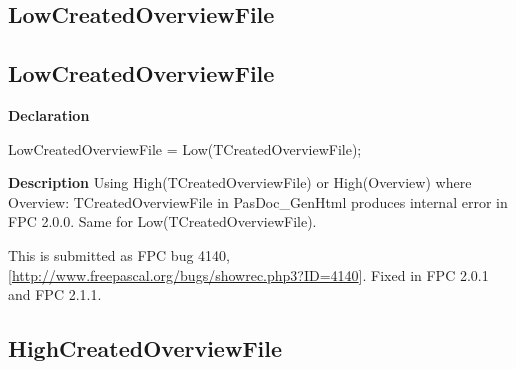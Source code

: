 \documentclass{report}
\newif\ifpdf
\begin{document}
\subsection*{\large{\textbf{LowCreatedOverviewFile}}\normalsize\hspace{1ex}\hrulefill}
\else
\subsection*{LowCreatedOverviewFile}
\fi
\label{PasDoc_Gen-LowCreatedOverviewFile}
\begin{list}{}{
\setlength{\itemindent}{0cm}
\setlength{\listparindent}{0cm}
\setlength{\leftmargin}{\evensidemargin}
\addtolength{\leftmargin}{\tmplength}
\settowidth{\labelsep}{X}
\addtolength{\leftmargin}{\labelsep}
\setlength{\labelwidth}{\tmplength}
}
\item[\textbf{Declaration}\hfill]
\ifpdf
\begin{flushleft}
\fi
\begin{ttfamily}
LowCreatedOverviewFile = Low(TCreatedOverviewFile);\end{ttfamily}

\ifpdf
\end{flushleft}
\fi

\par
\item[\textbf{Description}]
Using High(TCreatedOverviewFile) or High(Overview) where Overview: TCreatedOverviewFile in PasDoc{\_}GenHtml produces internal error in FPC 2.0.0. Same for Low(TCreatedOverviewFile).

This is submitted as FPC bug 4140, [\href{http://www.freepascal.org/bugs/showrec.php3?ID=4140}{http://www.freepascal.org/bugs/showrec.php3?ID=4140}]. Fixed in FPC 2.0.1 and FPC 2.1.1.

\end{list}
\ifpdf
\subsection*{\large{\textbf{HighCreatedOverviewFile}}\normalsize\hspace{1ex}\hrulefill}
\else
\end{document}
